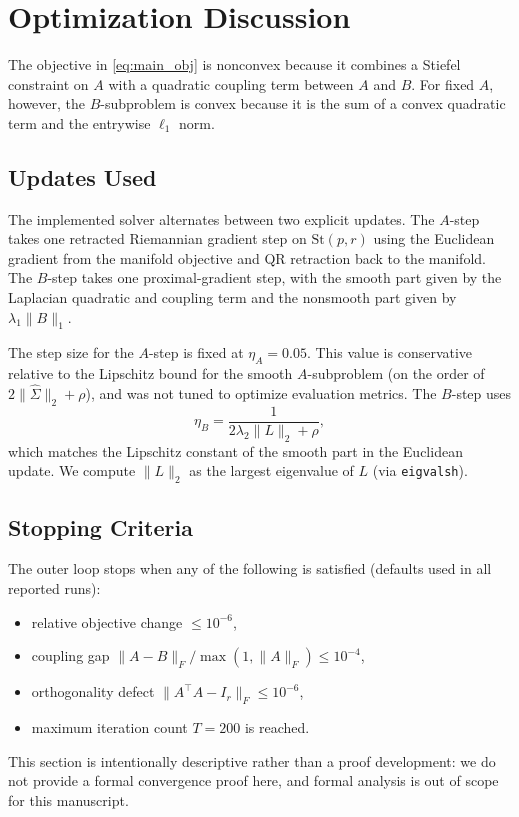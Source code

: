 \documentclass[10pt,twocolumn,letterpaper]{article}
\theoremstyle{definition}
\newcommand{\stiefel}{\mathrm{St}}
\newcommand{\Sigmahat}{\widehat{\Sigma}}
\begin{document}
\section{Optimization Discussion}
\label{sec:theory}

The objective in \eqref{eq:main_obj} is nonconvex because it combines a Stiefel constraint on $A$ with a quadratic coupling term between $A$ and $B$. For fixed $A$, however, the $B$-subproblem is convex because it is the sum of a convex quadratic term and the entrywise $\ell_1$ norm.

\subsection{Updates Used}
The implemented solver alternates between two explicit updates. The $A$-step takes one retracted Riemannian gradient step on $\stiefel(p,r)$ using the Euclidean gradient from the manifold objective and QR retraction back to the manifold. The $B$-step takes one proximal-gradient step, with the smooth part given by the Laplacian quadratic and coupling term and the nonsmooth part given by $\lambda_1 \|B\|_1$.

The step size for the $A$-step is fixed at $\eta_A=0.05$. This value is conservative relative to the Lipschitz bound for the smooth $A$-subproblem (on the order of $2\|\Sigmahat\|_2 + \rho$), and was not tuned to optimize evaluation metrics. The $B$-step uses
\[
\eta_B = \frac{1}{2\lambda_2 \|L\|_2 + \rho},
\]
which matches the Lipschitz constant of the smooth part in the Euclidean update. We compute $\|L\|_2$ as the largest eigenvalue of $L$ (via \texttt{eigvalsh}).

\subsection{Stopping Criteria}
The outer loop stops when any of the following is satisfied (defaults used in all reported runs):
\begin{itemize}[leftmargin=*]
    \item relative objective change $\le 10^{-6}$,
    \item coupling gap $\|A-B\|_F / \max(1,\|A\|_F) \le 10^{-4}$,
    \item orthogonality defect $\|A^\top A - I_r\|_F \le 10^{-6}$,
    \item maximum iteration count $T=200$ is reached.
\end{itemize}

This section is intentionally descriptive rather than a proof development: we do not provide a formal convergence proof here, and formal analysis is out of scope for this manuscript.
\end{document}
